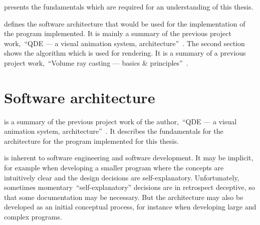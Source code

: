 \documentclass[%
    a4paper,    %
    justified,  %
    nobib,      %
    openany     %
]{tufte-book}
\makeatletter
\renewcommand{\label}[1]{\@tufte@label{##1}}%
\makeatother
\begin{document}
 presents the fundamentals which are required for
an understanding of this thesis.

 defines the software architecture
that would be used for the implementation of the program implemented. It is
mainly a summary of the previous project work,~\enquote{QDE --- a visual
animation system, architecture}~\cite{osterwalder-qde-2016}. The second section
shows the algorithm which is used for rendering. It is a summary of a previous
project work,~\enquote{Volume ray casting --- basics \&
principles}~\cite{osterwalder-volume-2016}.

\section{Software architecture}
\label{soarch}

 is a summary of the previous project work of the
author,~\enquote{QDE --- a visual animation system,
architecture}~\cite{osterwalder-qde-2016}. It describes the fundamentals for the
architecture for the program implemented for this thesis.

 is inherent to software engineering and
software development. It may be implicit, for example when developing a smaller
program where the concepts are intuitively clear and the design decisions are
self-explanatory. Unfortunately, sometimes momentary~\enquote{self-explanatory}
decisions are in retrospect deceptive, so that some documentation may be
necessary. But the architecture may also be developed as an initial conceptual
process, for instance when developing large and complex programs.
\end{document}
